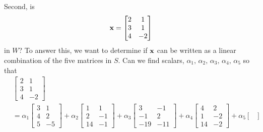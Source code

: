 \documentclass{ximera}
\begin{document}
\begin{example}[A subspace of $M_{32}$]
  Second, is
  \[
    \mathbf{x}=\begin{bmatrix}
      2 & 1 \\ 3 & 1 \\ 4 & -2
    \end{bmatrix}
  \]
  in $W$?  To answer this, we want to determine if $\mathbf{x}$ can be
  written as a linear combination of the five matrices in $S$.  Can we
  find scalars, $\alpha_1,\,\alpha_2,\,\alpha_3,\,\alpha_4,\,\alpha_5$
  so that
  \begin{align*}
    &\begin{bmatrix}
      2 & 1 \\ 3 & 1 \\ 4 & -2
    \end{bmatrix}\\
    &=
      \alpha_1
      \begin{bmatrix}
        3 & 1 \\ 4 & 2 \\ 5 & -5
      \end{bmatrix}
                              +\alpha_2
                              \begin{bmatrix}
                                1 & 1 \\ 2 & -1 \\ 14 & -1
                              \end{bmatrix}
                                                        +\alpha_3
                                                        \begin{bmatrix}
                                                          3 & -1 \\ -1 & 2 \\ -19 & -11
                                                        \end{bmatrix}
                                                                                    +\alpha_4
                                                                                    \begin{bmatrix}
                                                                                      4 & 2 \\ 1 & -2 \\ 14 & -2
                                                                                    \end{bmatrix}
                                                                                                              +\alpha_5
                                                                                                              \begin{bmatrix}

\end{bmatrix}
\end{align*}
\end{example}
\end{document}
